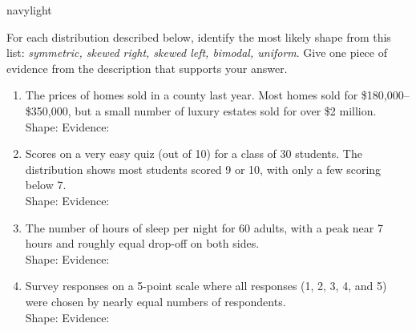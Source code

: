 \documentclass[10pt]{article}
\begin{document}
\begin{blurbbox}{navylight}
\small

For each distribution described below, identify the most likely shape from
this list: \textit{symmetric, skewed right, skewed left, bimodal, uniform}.
Give one piece of evidence from the description that supports your answer.

\vspace{10pt}

\begin{enumerate}[leftmargin=1.5em, itemsep=14pt]

  \item The prices of homes sold in a county last year. Most homes sold for
        \$180{,}000--\$350{,}000, but a small number of luxury estates sold
        for over \$2 million.\\[4pt]
        Shape: \blank{3.5cm} \quad Evidence: \blank{6cm}\\[1pt]
        \writeline

  \item Scores on a very easy quiz (out of 10) for a class of 30 students.
        The distribution shows most students scored 9 or 10, with only a few
        scoring below 7.\\[4pt]
        Shape: \blank{3.5cm} \quad Evidence: \blank{6cm}\\[1pt]
        \writeline

  \item The number of hours of sleep per night for 60 adults, with a peak
        near 7 hours and roughly equal drop-off on both sides.\\[4pt]
        Shape: \blank{3.5cm} \quad Evidence: \blank{6cm}\\[1pt]
        \writeline

  \item Survey responses on a 5-point scale where all responses (1, 2, 3, 4,
        and 5) were chosen by nearly equal numbers of respondents.\\[4pt]
        Shape: \blank{3.5cm} \quad Evidence: \blank{6cm}\\[1pt]
        \writeline

\end{enumerate}

\end{blurbbox}

\vspace{0.14in}
\end{document}
